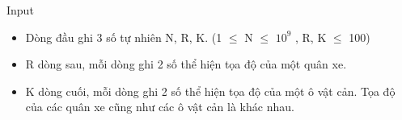 Input
\begin{itemize}
	\item     Dòng đầu ghi 3 số tự nhiên N, R, K. (1  $\le$  N  $\le$  $10^{9}$    , R, K  $\le$  100)   
	\item     R dòng sau, mỗi dòng ghi 2 số thể hiện tọa độ của một quân xe.   
	\item     K dòng cuối, mỗi dòng ghi 2 số thể hiện tọa độ của một ô vật cản. Tọa độ của các quân xe cũng như các ô vật cản là khác nhau.   
\end{itemize}